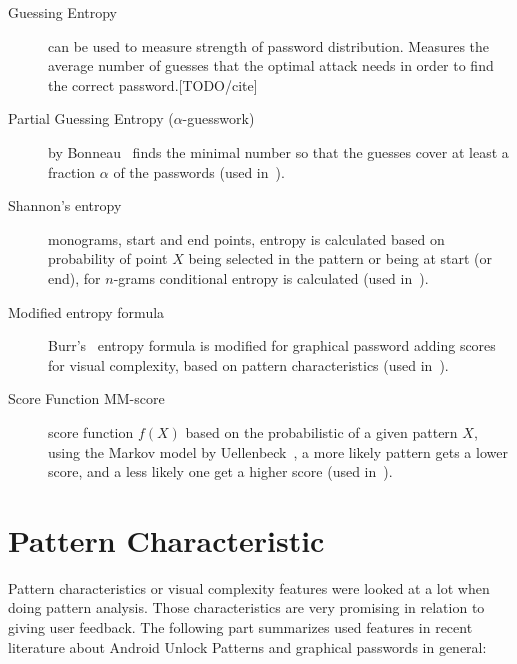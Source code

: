 \documentclass[twocolumn, a4paper, 10pt]{article}
\begin{document}
\begin{description}
	\item[Guessing Entropy] can be used to measure strength of password distribution. Measures the average number of guesses that the optimal attack needs in order to find the correct password.[TODO/cite]
	
	\item[Partial Guessing Entropy ($\alpha$-guesswork)] by Bonneau~\cite{Bonneau:2012:QRP:2310656.2310722} finds the minimal number so that the guesses cover at least a fraction $\alpha$ of the passwords (used in~\cite{Uellenbeck:2013:QSG:2508859.2516700}).
	
	\item[Shannon's entropy] monograms, start and end points, entropy is calculated based on probability of point $X$ being selected in the pattern or being at start (or end), for $n$-grams conditional entropy is calculated (used in~\cite{Aviv:2014:UVP:2664243.2664253}).
	
	\item[Modified entropy formula] Burr's~\cite{burr2004electronic} entropy formula is modified for graphical password adding scores for visual complexity,  based on pattern characteristics (used in~\cite{Sun2014308}).
	
	\item[Score Function MM-score] score function $f(X)$ based on the probabilistic of a given pattern $X$, using the Markov model by Uellenbeck~\cite{Uellenbeck:2013:QSG:2508859.2516700}, a more likely pattern gets a lower score, and a less likely one get a higher score (used in~\cite{siadati2015fortifying}).
\end{description}

\section{Pattern Characteristic}
\label{sec:characteristics}
Pattern characteristics or visual complexity features were looked at a lot when doing pattern  analysis. Those characteristics are very promising in relation to giving user feedback. The following part summarizes used features in recent literature about Android Unlock Patterns and graphical passwords in general:
\end{document}
